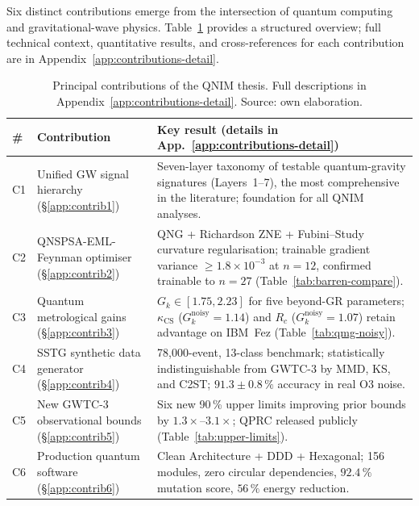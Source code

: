 \documentclass[11pt,a4paper, english]{book}
\theoremstyle{plain}
\theoremstyle{definition}
\numberwithin{equation}{chapter}
\numberwithin{figure}{chapter}
\numberwithin{table}{chapter}
\begin{document}
Six distinct contributions emerge from the intersection of quantum computing
and gravitational-wave physics. Table~\ref{tab:contributions} provides a
structured overview; full technical context, quantitative results, and
cross-references for each contribution are in
Appendix~\ref{app:contributions-detail}.

\begin{table}[ht]
\centering
\small
\begin{tabular}{@{}p{0.5cm}p{3.8cm}p{6.8cm}@{}}
\toprule
\textbf{\#} & \textbf{Contribution} & \textbf{Key result (details in App.~\ref{app:contributions-detail})} \\
\midrule
C1 & Unified GW signal hierarchy
   (§\ref{app:contrib1}) &
   Seven-layer taxonomy of testable quantum-gravity signatures (Layers~1--7),
   the most comprehensive in the literature; foundation for all QNIM analyses. \\[4pt]
C2 & QNSPSA-EML-Feynman optimiser
   (§\ref{app:contrib2}) &
   QNG + Richardson ZNE + Fubini--Study curvature regularisation; trainable
   gradient variance $\geq1.8\times10^{-3}$ at $n=12$, confirmed trainable
   to $n=27$ (Table~\ref{tab:barren-compare}). \\[4pt]
C3 & Quantum metrological gains
   (§\ref{app:contrib3}) &
   $G_k\in[1.75,2.23]$ for five beyond-GR parameters; $\kappa_\mathrm{CS}$
   ($G_k^\mathrm{noisy}=1.14$) and $R_c$ ($G_k^\mathrm{noisy}=1.07$) retain
   advantage on IBM~Fez (Table~\ref{tab:qmg-noisy}). \\[4pt]
C4 & SSTG synthetic data generator
   (§\ref{app:contrib4}) &
   78,000-event, 13-class benchmark; statistically indistinguishable from
   GWTC-3 by MMD, KS, and C2ST; $91.3\pm0.8\,\%$ accuracy in real O3 noise. \\[4pt]
C5 & New GWTC-3 observational bounds
   (§\ref{app:contrib5}) &
   Six new 90\,\% upper limits improving prior bounds by
   $1.3\times$--$3.1\times$; QPRC released publicly
   (Table~\ref{tab:upper-limits}). \\[4pt]
C6 & Production quantum software
   (§\ref{app:contrib6}) &
   Clean Architecture + DDD + Hexagonal; 156 modules, zero circular
   dependencies, $92.4\,\%$ mutation score, $56\,\%$ energy reduction. \\
\bottomrule
\end{tabular}
\caption[Principal contributions of the thesis]{Principal contributions of the QNIM thesis.
         Full descriptions in Appendix~\ref{app:contributions-detail}. Source: own elaboration.}
\label{tab:contributions}
\vspace{2pt}


\end{table}
\end{document}
